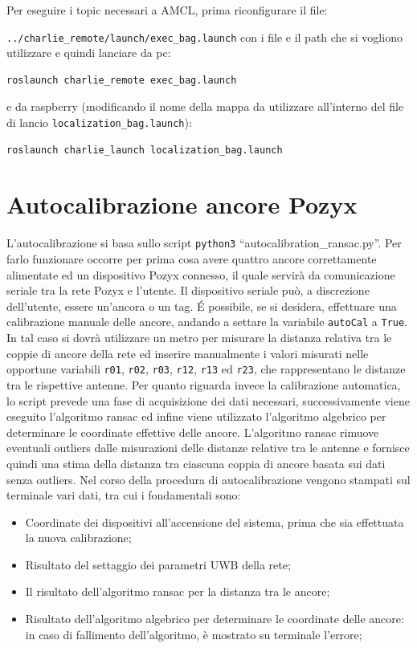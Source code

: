 Per eseguire i topic necessari a AMCL, prima riconfigurare il file:

\verb|../charlie_remote/launch/exec_bag.launch| con i file e il path che si vogliono utilizzare e quindi lanciare da pc:
\begin{lstlisting}[style=bashPC]
	roslaunch charlie_remote exec_bag.launch
\end{lstlisting}
e da raspberry (modificando il nome della mappa da utilizzare all'interno del file di lancio \verb|localization_bag.launch|):
\begin{lstlisting}[style=bash]
	roslaunch charlie_launch localization_bag.launch
\end{lstlisting}

\newpage
\appendix
\section{Autocalibrazione ancore Pozyx}
\label{sez:Autocalibrazione}
L'autocalibrazione si basa sullo script \texttt{python3} ``autocalibration\_ransac.py''. 
Per farlo funzionare occorre per prima cosa avere quattro ancore correttamente alimentate ed un dispositivo Pozyx connesso, il quale servirà da comunicazione seriale tra la rete Pozyx e l’utente. 
Il dispositivo seriale può, a discrezione dell’utente, essere un’ancora o un tag. 
É possibile, se si desidera, effettuare una calibrazione manuale delle ancore, andando a settare la variabile \verb|autoCal| a \verb|True|. 
In tal caso si dovrà utilizzare un metro per misurare la distanza relativa tra le coppie di ancore della rete ed inserire manualmente i valori misurati nelle opportune variabili \texttt{r01}, \texttt{r02}, \texttt{r03}, \texttt{r12}, \texttt{r13} ed \texttt{r23}, che rappresentano le distanze tra le rispettive antenne.
Per quanto riguarda invece la calibrazione automatica, lo script prevede una fase di acquisizione dei dati necessari, successivamente viene eseguito l’algoritmo ransac ed infine viene utilizzato l’algoritmo algebrico per determinare le coordinate effettive delle ancore. 
L’algoritmo ransac rimuove eventuali outliers dalle misurazioni delle distanze relative tra le antenne e fornisce quindi una stima della distanza tra ciascuna coppia di ancore basata sui dati senza outliers.
Nel corso della procedura di autocalibrazione vengono stampati sul terminale vari dati, tra cui i fondamentali sono:
\begin{itemize}
	\item Coordinate dei dispositivi all’accensione del sistema, prima che sia effettuata la nuova calibrazione;
	
	\item Risultato del settaggio dei parametri UWB della rete;
	
	\item Il risultato dell’algoritmo ransac per la distanza tra le ancore;
	
	\item Risultato dell'algoritmo algebrico per determinare le coordinate delle ancore: in caso di fallimento dell'algoritmo, \`e mostrato su terminale l'errore;
\end{itemize}

